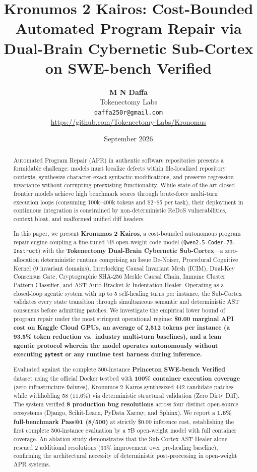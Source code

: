 \documentclass[10pt,twocolumn,letterpaper]{article}
\title{\textbf{Kronumos 2 Kairos: Cost-Bounded Automated Program Repair via Dual-Brain Cybernetic Sub-Cortex on SWE-bench Verified}}
\author{
  \textbf{M N Daffa} \\
  Tokenectomy Labs \\
  \texttt{daffa250r@gmail.com} \\
  \url{https://github.com/Tokenectomy-Labs/Kronomus}
}
\date{September 2026}
\begin{document}
\maketitle

\begin{abstract}
Automated Program Repair (APR) in authentic software repositories presents a formidable challenge: models must localize defects within file-localized repository contexts, synthesize character-exact syntactic modifications, and preserve regression invariance without corrupting preexisting functionality. While state-of-the-art closed frontier models achieve high benchmark scores through brute-force multi-turn execution loops (consuming 100k--400k tokens and \$2--\$5 per task), their deployment in continuous integration is constrained by non-deterministic ReDoS vulnerabilities, context bloat, and malformed unified diff headers. 

In this paper, we present \textbf{Kronumos 2 Kairos}, a cost-bounded autonomous program repair engine coupling a fine-tuned 7B open-weight code model (\texttt{Qwen2.5-Coder-7B-Instruct}) with the \textbf{Tokenectomy Dual-Brain Cybernetic Sub-Cortex}---a zero-allocation deterministic runtime comprising an Issue De-Noiser, Procedural Cognitive Kernel (9 invariant domains), Interlocking Causal Invariant Mesh (ICIM), Dual-Key Consensus Gate, Cryptographic SHA-256 Merkle Causal Chain, Immune Cluster Pattern Classifier, and AST Auto-Bracket \& Indentation Healer. Operating as a closed-loop agentic system with up to 5 self-healing turns per instance, the Sub-Cortex validates every state transition through simultaneous semantic and deterministic AST consensus before admitting patches. We investigate the empirical lower bound of program repair under the most stringent operational regime: \textbf{\$0.00 marginal API cost on Kaggle Cloud GPUs, an average of 2,512 tokens per instance (a 93.5\% token reduction vs.\ industry multi-turn baselines), and a lean agentic protocol wherein the model operates autonomously without executing \texttt{pytest} or any runtime test harness during inference.}

Evaluated against the complete 500-instance \textbf{Princeton SWE-bench Verified} dataset using the official Docker testbed with \textbf{100\% container execution coverage} (zero infrastructure failures), Kronumos 2 Kairos synthesized 442 candidate patches while withholding 58 (11.6\%) via deterministic structural validation (Zero Dirty Diff). The system verified \textbf{8 production bug resolutions} across four distinct open-source ecosystems (Django, Scikit-Learn, PyData Xarray, and Sphinx). We report a \textbf{1.6\% full-benchmark Pass@1 (8/500)} at strictly \$0.00 inference cost, establishing the first complete 500-instance evaluation by a 7B open-weight model with full container coverage. An ablation study demonstrates that the Sub-Cortex AST Healer alone rescued 2 additional resolutions (33\% improvement over pre-healing baseline), confirming the architectural necessity of deterministic post-processing in open-weight APR systems.
\end{abstract}
\end{document}

